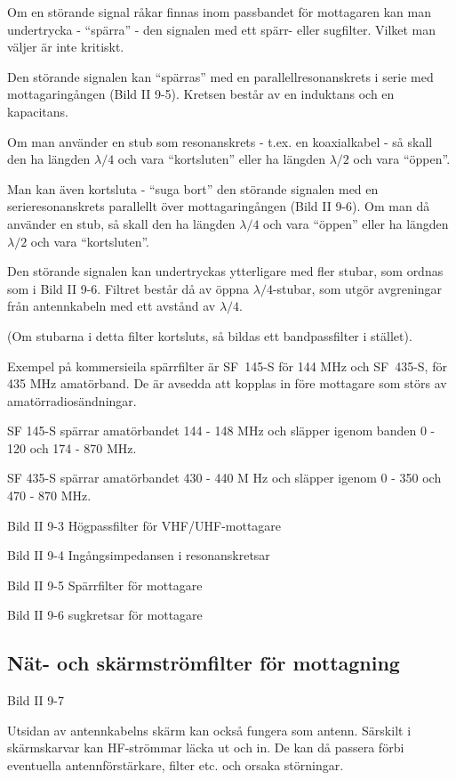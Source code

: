 Om en störande signal råkar finnas inom passbandet för mottagaren kan
man undertrycka - ``spärra'' - den signalen med ett spärr- eller
sugfilter. Vilket man väljer är inte kritiskt.

Den störande signalen kan ``spärras'' med en parallellresonanskrets i
serie med mottagaringången (Bild II 9-5). Kretsen består av en induktans
och en kapacitans.

Om man använder en stub som resonanskrets - t.ex. en koaxialkabel - så
skall den ha längden \(\lambda/4\) och vara ``kortsluten'' eller ha
längden \(\lambda/2\) och vara ``öppen''.

Man kan även kortsluta - ``suga bort'' den störande signalen med en
serieresonanskrets parallellt över mottagaringången (Bild II 9-6). Om
man då använder en stub, så skall den ha längden \(\lambda/4\) och
vara ``öppen'' eller ha längden \(\lambda/2\) och vara ``kortsluten''.

Den störande signalen kan undertryckas ytterligare med fler stubar,
som ordnas som i Bild II 9-6. Filtret består då av öppna
\(\lambda/4\)-stubar, som utgör avgreningar från antennkabeln med ett
avstånd av \(\lambda/4\).

(Om stubarna i detta filter kortsluts, så bildas ett bandpassfilter i
stället).

Exempel på kommersieila spärrfilter är SF~145-S för 144 MHz och
SF~435-S, för 435 MHz amatörband. De är avsedda att kopplas in före
mottagare som störs av amatörradiosändningar.

SF 145-S spärrar amatörbandet 144 - 148 MHz och släpper igenom banden
0 - 120 och 174 - 870 MHz.

SF 435-S spärrar amatörbandet 430 - 440 M Hz och släpper igenom 0 -
350 och 470 - 870 MHz.

Bild II 9-3 Högpassfilter för VHF/UHF-mottagare

Bild II 9-4 Ingångsimpedansen i resonanskretsar

Bild II 9-5 Spärrfilter för mottagare

Bild II 9-6 sugkretsar för mottagare

\subsection{Nät- och skärmströmfilter för mottagning}

Bild II 9-7

Utsidan av antennkabelns skärm kan också fungera som antenn. Särskilt
i skärmskarvar kan HF-strömmar läcka ut och in. De kan då passera förbi
eventuella antennförstärkare, filter etc. och orsaka störningar.

